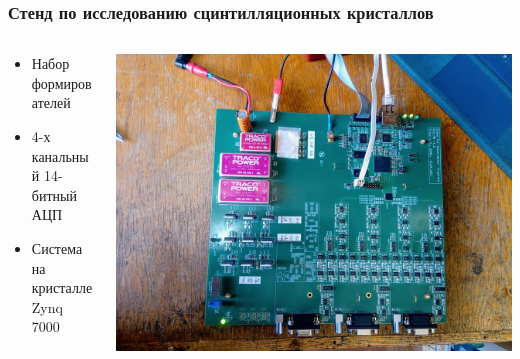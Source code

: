 \documentclass[aspectratio=169]{beamer}
\begin{document}
\begin{frame}
\frametitle{Стенд по исследованию сцинтилляционных кристаллов}
    \begin{columns}
        \begin{column}{0.4\textwidth}
            \begin{itemize}
                \item Набор формирователей 
                \item 4-х канальный 14-битный АЦП
                \item Система на кристалле Zynq 7000
            \end{itemize}
        \end{column}
        \begin{column}{0.6\textwidth}
            \includegraphics[width=\textwidth]{board.jpg}
        \end{column}
    \end{columns}
\end{frame}
\end{document}
